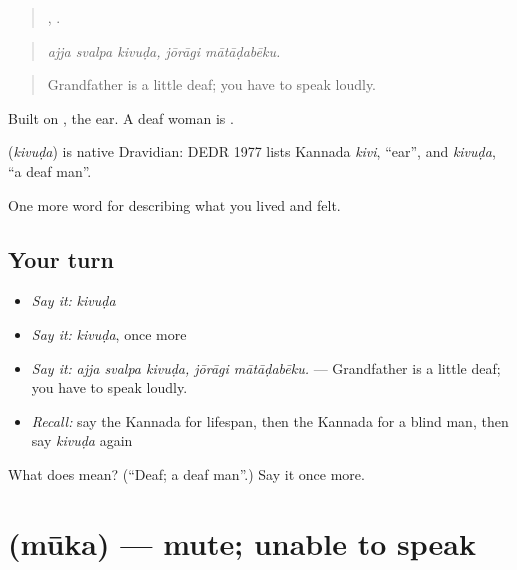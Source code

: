 \begin{quote}
  ,  .
\end{quote}

\begin{quote}
\emph{ajja svalpa kivuḍa, jōrāgi mātāḍabēku.}
\end{quote}

\begin{quote}
Grandfather is a little deaf; you have to speak loudly.
\end{quote}

Built on , the ear. A deaf woman is .

\begin{cousinweb}
\textbf{} (\emph{kivuḍa}) is native Dravidian: DEDR 1977 lists Kannada \emph{kivi}, \textquotedblleft{}ear\textquotedblright{}, and \emph{kivuḍa}, \textquotedblleft{}a deaf man\textquotedblright{}.
\end{cousinweb}

\begin{grammarlens}[title={What you've built}]
One more word for describing what you lived and felt.
\end{grammarlens}

\subsection*{Your turn}
\begin{itemize}
\raggedright
  \item \emph{Say it:} \emph{kivuḍa}
  \item \emph{Say it:} \emph{kivuḍa}, once more
  \item \emph{Say it:} \emph{ajja svalpa kivuḍa, jōrāgi mātāḍabēku.} — Grandfather is a little deaf; you have to speak loudly.
  \item \emph{Recall:} say the Kannada for lifespan, then the Kannada for a blind man, then say \emph{kivuḍa} again
\end{itemize}

\begin{tcolorbox}[breakable,colback=teal!4,colframe=teal!35!black,title={Before you move on}]
What does  mean? (\textquotedblleft{}Deaf; a deaf man\textquotedblright{}.) Say it once more.
\end{tcolorbox}
\section[\texorpdfstring{\kn{ಮೂಕ} (mūka)}{ಮೂಕ (mūka)}]{ (mūka) — mute; unable to speak}

